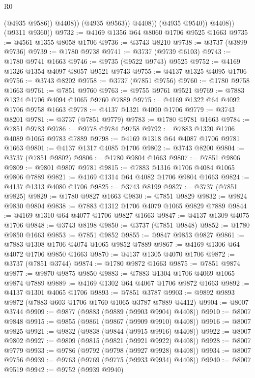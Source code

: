 \begin{lexlean}{R0}
\begin{coremodule}
                        (@4935 @9586))
                      @4408))
                  (@4935 @9563))
                @4408))
            (@4935 @9540))
          @4408))
      (@9311 @9360))
@9732 := @4169 @1356 @64 @8060 @1706 @9525 @1663
@9735 := @4561 @1355 @8058 @1706
@9736 := @3743 @8210
@9738 := @3737 (@3899 @9736)
@9739 := @1780 @9738
@9741 := @3737 (@9739 @6103)
@9743 := @1780 @9741 @1663
@9746 := @9735 (@9522 @9743) @9525
@9752 := @4169 @1326 @1354 @4097 @8057 @9521 @9743
@9755 := @4137 @1325 @4095 @1706
@9756 := @3743 @8202
@9758 := @3737 (@7851 @9756)
@9760 := @1780 @9758 @1663
@9761 := @7851 @9760
@9763 := @9755 @9761 @9521
@9769 := @7883 @1324 @1706 @4094 @1065 @9760 @7889
@9775 := @4169 @1322 @64 @4092 @1706 @9758 @1663
@9778 := @4137 @1321 @4090 @1706
@9779 := @3743 @8201
@9781 := @3737 (@7851 @9779)
@9783 := @1780 @9781 @1663
@9784 := @7851 @9783
@9786 := @9778 @9784 @9758
@9792 := @7883 @1320 @1706 @4089 @1065 @9783 @7889
@9798 := @4169 @1318 @64 @4087 @1706 @9781 @1663
@9801 := @4137 @1317 @4085 @1706
@9802 := @3743 @8200
@9804 := @3737 (@7851 @9802)
@9806 := @1780 @9804 @1663
@9807 := @7851 @9806
@9809 := @9801 @9807 @9781
@9815 := @7883 @1316 @1706 @4084 @1065 @9806 @7889
@9821 := @4169 @1314 @64 @4082 @1706 @9804 @1663
@9824 := @4137 @1313 @4080 @1706
@9825 := @3743 @8199
@9827 := @3737 (@7851 @9825)
@9829 := @1780 @9827 @1663
@9830 := @7851 @9829
@9832 := @9824 @9830 @9804
@9838 := @7883 @1312 @1706 @4079 @1065 @9829 @7889
@9844 := @4169 @1310 @64 @4077 @1706 @9827 @1663
@9847 := @4137 @1309 @4075 @1706
@9848 := @3743 @8198
@9850 := @3737 (@7851 @9848)
@9852 := @1780 @9850 @1663
@9853 := @7851 @9852
@9855 := @9847 @9853 @9827
@9861 := @7883 @1308 @1706 @4074 @1065 @9852 @7889
@9867 := @4169 @1306 @64 @4072 @1706 @9850 @1663
@9870 := @4137 @1305 @4070 @1706
@9872 := @3737 (@7851 @3744)
@9874 := @1780 @9872 @1663
@9875 := @7851 @9874
@9877 := @9870 @9875 @9850
@9883 := @7883 @1304 @1706 @4069 @1065 @9874 @7889
@9889 := @4169 @1302 @64 @4067 @1706 @9872 @1663
@9892 := @4137 @1301 @4065 @1706
@9893 := @7851 @3787
@9903 := @9892 @9893 @9872 (@7883 @603 @1706 @1760 @1065 @3787 @7889 @4412)
@9904 := @8007 @3744
@9909 := @9877 (@9883 (@9889 (@9903 @9904) @4408))
@9910 := @8007 @9848
@9915 := @9855 (@9861 (@9867 (@9909 @9910) @4408))
@9916 := @8007 @9825
@9921 := @9832 (@9838 (@9844 (@9915 @9916) @4408))
@9922 := @8007 @9802
@9927 := @9809 (@9815 (@9821 (@9921 @9922) @4408))
@9928 := @8007 @9779
@9933 := @9786 (@9792 (@9798 (@9927 @9928) @4408))
@9934 := @8007 @9756
@9939 := @9763 (@9769 (@9775 (@9933 @9934) @4408))
@9940 := @8007 @9519
@9942 := @9752 (@9939 @9940)

\end{coremodule}
\end{lexlean}
